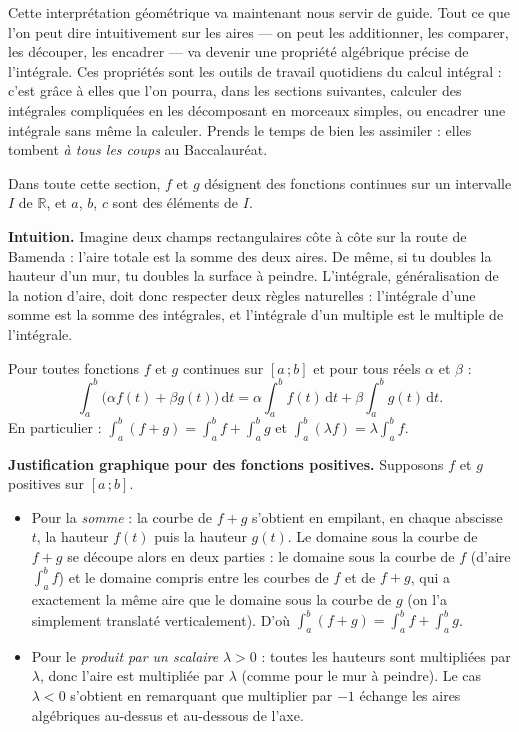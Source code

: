 \documentclass[11pt]{article}
\newcommand{\cle}[1]{{\popxbold\color{popdark}#1}}
\newcounter{popsec}
\newcounter{popsub}
\newcommand{\courssub}[1]{%
  \stepcounter{popsub}%
  \par\vspace{9pt}\noindent{\popxbold\fontsize{11.5}{13}\selectfont\color{popink}{\color{poporange}\thepopsec.\thepopsub}\hspace{6pt}#1}\par\nopagebreak\vspace{4pt}
}
\begin{document}
Cette interprétation géométrique va maintenant nous servir de guide. Tout ce que l'on peut dire intuitivement sur les aires — on peut les additionner, les comparer, les découper, les encadrer — va devenir une propriété algébrique précise de l'intégrale. Ces propriétés sont les outils de travail quotidiens du calcul intégral : c'est grâce à elles que l'on pourra, dans les sections suivantes, calculer des intégrales compliquées en les décomposant en morceaux simples, ou encadrer une intégrale sans même la calculer. Prends le temps de bien les assimiler : elles tombent \emph{à tous les coups} au Baccalauréat.

Dans toute cette section, $f$ et $g$ désignent des fonctions \cle{continues} sur un intervalle $I$ de $\mathbb{R}$, et $a$, $b$, $c$ sont des éléments de $I$.

\courssub{Linéarité de l'intégrale}

\textbf{Intuition.} Imagine deux champs rectangulaires côte à côte sur la route de Bamenda : l'aire totale est la somme des deux aires. De même, si tu doubles la hauteur d'un mur, tu doubles la surface à peindre. L'intégrale, généralisation de la notion d'aire, doit donc respecter deux règles naturelles : l'intégrale d'une somme est la somme des intégrales, et l'intégrale d'un multiple est le multiple de l'intégrale.

\begin{propriete}
Pour toutes fonctions $f$ et $g$ continues sur $[a\,;b]$ et pour tous réels $\alpha$ et $\beta$ :
\[ \int_a^b \bigl(\alpha f(t) + \beta g(t)\bigr)\,\mathrm{d}t = \alpha\int_a^b f(t)\,\mathrm{d}t + \beta\int_a^b g(t)\,\mathrm{d}t. \]
En particulier : $\displaystyle\int_a^b (f+g) = \int_a^b f + \int_a^b g$ et $\displaystyle\int_a^b (\lambda f) = \lambda \int_a^b f$.
\end{propriete}

\textbf{Justification graphique pour des fonctions positives.} Supposons $f$ et $g$ positives sur $[a\,;b]$.

\begin{itemize}
\item Pour la \emph{somme} : la courbe de $f+g$ s'obtient en empilant, en chaque abscisse $t$, la hauteur $f(t)$ puis la hauteur $g(t)$. Le domaine sous la courbe de $f+g$ se découpe alors en deux parties : le domaine sous la courbe de $f$ (d'aire $\int_a^b f$) et le domaine compris entre les courbes de $f$ et de $f+g$, qui a exactement la même aire que le domaine sous la courbe de $g$ (on l'a simplement translaté verticalement). D'où $\int_a^b (f+g) = \int_a^b f + \int_a^b g$.
\item Pour le \emph{produit par un scalaire} $\lambda > 0$ : toutes les hauteurs sont multipliées par $\lambda$, donc l'aire est multipliée par $\lambda$ (comme pour le mur à peindre). Le cas $\lambda < 0$ s'obtient en remarquant que multiplier par $-1$ échange les aires algébriques au-dessus et au-dessous de l'axe.
\end{itemize}
\end{document}
